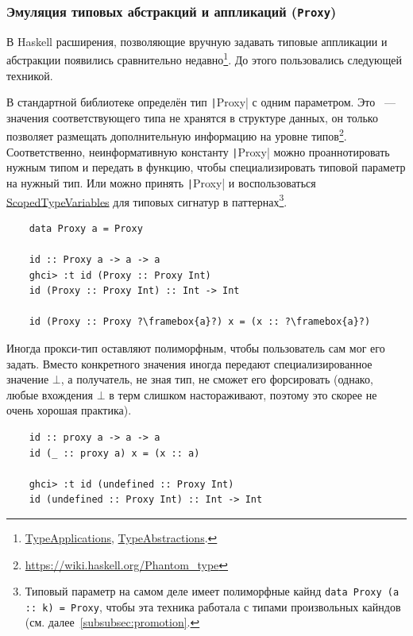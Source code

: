 \subsubsection{Эмуляция типовых абстракций и аппликаций (\texttt{Proxy})} \label{subsubsec:proxy}

В Haskell расширения, позволяющие вручную задавать типовые аппликации и абстракции появились сравнительно недавно\footnote{\href{https://downloads.haskell.org/ghc/latest/docs/users_guide/exts/type_applications.html\#extension-TypeApplications}{TypeApplications}, \href{https://downloads.haskell.org/ghc/latest/docs/users_guide/exts/type_abstractions.html\#extension-TypeAbstractions}{TypeAbstractions}.}.
До этого пользовались следующей техникой.

В стандартной библиотеке определён тип \texttt|Proxy| с одним параметром.
Это ~--- значения соответствующего типа не хранятся в структуре данных, он только позволяет размещать дополнительную информацию на уровне типов\footnote{\url{https://wiki.haskell.org/Phantom_type}}.
Соответственно, неинформативную константу \texttt|Proxy| можно проаннотировать нужным типом и передать в функцию, чтобы специализировать типовой параметр на нужный тип.
Или можно принять \texttt|Proxy| и воспользоваться \href{https://downloads.haskell.org/ghc/latest/docs/users_guide/exts/scoped_type_variables.html\#pattern-type-signatures}{ScopedTypeVariables} для типовых сигнатур в паттернах\footnote{Типовый параметр на самом деле имеет полиморфные кайнд \texttt{data Proxy (a :: k) = Proxy}, чтобы эта техника работала с типами произвольных кайндов (см. далее\ \ref{subsubsec:promotion}.}.
\begin{verbatim}
    data Proxy a = Proxy

    id :: Proxy a -> a -> a
    ghci> :t id (Proxy :: Proxy Int)
    id (Proxy :: Proxy Int) :: Int -> Int

    id (Proxy :: Proxy ?\framebox{a}?) x = (x :: ?\framebox{a}?)
\end{verbatim}

Иногда прокси-тип оставляют полиморфным, чтобы пользователь сам мог его задать.
Вместо конкретного значения иногда передают специализированное значение $\bot$, а получатель, не зная тип, не сможет его форсировать (однако, любые вхождения $\bot$ в терм слишком настораживают, поэтому это скорее не очень хорошая практика).
\begin{verbatim}
    id :: proxy a -> a -> a
    id (_ :: proxy a) x = (x :: a)

    ghci> :t id (undefined :: Proxy Int)
    id (undefined :: Proxy Int) :: Int -> Int
\end{verbatim}

